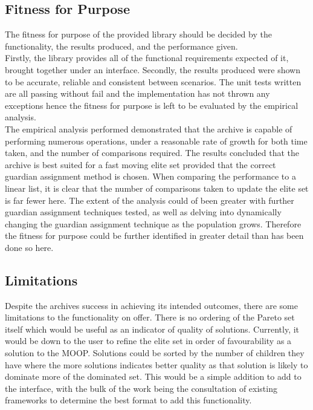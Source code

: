 \documentclass{ecmm427_assignment}
\begin{document}
\subsection{Fitness for Purpose}
The fitness for purpose of the provided library should be decided by the functionality, the results produced, and the performance given.\\
Firstly, the library provides all of the functional requirements expected of it, brought together under an interface. Secondly, the results produced were shown to be accurate, reliable and consistent between scenarios. The unit tests written are all passing without fail and the implementation has not thrown any exceptions hence the fitness for purpose is left to be evaluated by the empirical analysis.\\
The empirical analysis performed demonstrated that the archive is capable of performing numerous operations, under a reasonable rate of growth for both time taken, and the number of comparisons required. The results concluded that the archive is best suited for a fast moving elite set provided that the correct guardian assignment method is chosen. When comparing the performance to a linear list, it is clear that the number of comparisons taken to update the elite set is far fewer here. The extent of the analysis could of been greater with further guardian assignment techniques tested, as well as delving into dynamically changing the guardian assignment technique as the population grows. Therefore the fitness for purpose could be further identified in greater detail than has been done so here.

\subsection{Limitations}
Despite the archives success in achieving its intended outcomes, there are some limitations to the functionality on offer. There is no ordering of the Pareto set itself which would be useful as an indicator of quality of solutions. Currently, it would be down to the user to refine the elite set in order of favourability as a solution to the MOOP. Solutions could be sorted by the number of children they have where the more solutions indicates better quality as that solution is likely to dominate more of the dominated set. This would be a simple addition to add to the interface, with the bulk of the work being the consultation of existing frameworks to determine the best format to add this functionality.
\end{document}
